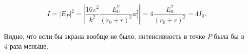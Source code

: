 \documentclass[12pt,a4paper]{article}
\numberwithin{equation}{section}
\numberwithin{equation}{section}
\begin{document}
\begin{equation}
I = |E_P|^2 =\left| \frac{16 \pi^2}{k^2} \frac{E_0^2}{(r_0 + r)^2} a_1^2 \right|= 4 \frac{E_0^2}{(r_0+r)^2} = 4I_0.
\end{equation}

Видно, что если бы экрана вообще не было, интенсивность в точке $P$ была
бы в 4 раза меньше.








\end{document}
